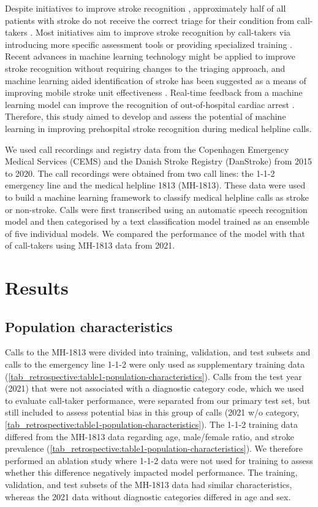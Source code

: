 {Despite initiatives to improve stroke recognition \parencite{cite8,cite9}, approximately half of all patients with stroke do not receive the correct triage for their condition from call-takers \parencite{cite10,cite11,cite12}. Most initiatives aim to improve stroke recognition by call-takers via introducing more specific assessment tools \parencite{cite8,cite9} or providing specialized training \parencite{cite13}. Recent advances in machine learning technology might be applied to improve stroke recognition without requiring changes to the triaging approach, and machine learning aided identification of stroke has been suggested as a means of improving mobile stroke unit effectiveness \parencite{cite7}. Real-time feedback from a machine learning model can improve the recognition of out-of-hospital cardiac arrest \parencite{cite14,cite15}. Therefore, this study aimed to develop and assess the potential of machine learning in improving prehospital stroke recognition during medical helpline calls.

We used call recordings and registry data from the Copenhagen Emergency Medical Services (CEMS) and the Danish Stroke Registry (DanStroke)\parencite{cite16} from 2015 to 2020. The call recordings were obtained from two call lines: the 1-1-2 emergency line and the medical helpline 1813 (MH-1813). These data were used to build a machine learning framework to classify medical helpline calls as stroke or non-stroke. Calls were first transcribed using an automatic speech recognition model and then categorised by a text classification model trained as an ensemble of five individual models. We compared the performance of the model with that of call-takers using MH-1813 data from 2021.



\section{Results}

\subsection{Population characteristics}
%
Calls to the MH-1813 were divided into training, validation, and test subsets and calls to the emergency line 1-1-2 were only used as supplementary training data (\cref{tab_retrospective:table1-population-characteristics}). Calls from the test year (2021) that were not associated with a diagnostic category code, which we used to evaluate call-taker performance, were separated from our primary test set, but still included to assess potential bias in this group of calls (2021 w/o category, \cref{tab_retrospective:table1-population-characteristics}).  The 1-1-2 training data differed from the MH-1813 data regarding age, male/female ratio, and stroke prevalence (\cref{tab_retrospective:table1-population-characteristics}). We therefore performed an ablation study where 1-1-2 data were not used for training to assess whether this difference negatively impacted model performance. The training, validation, and test subsets of the MH-1813 data had similar characteristics, whereas the 2021 data without diagnostic categories differed in age and sex.

}
